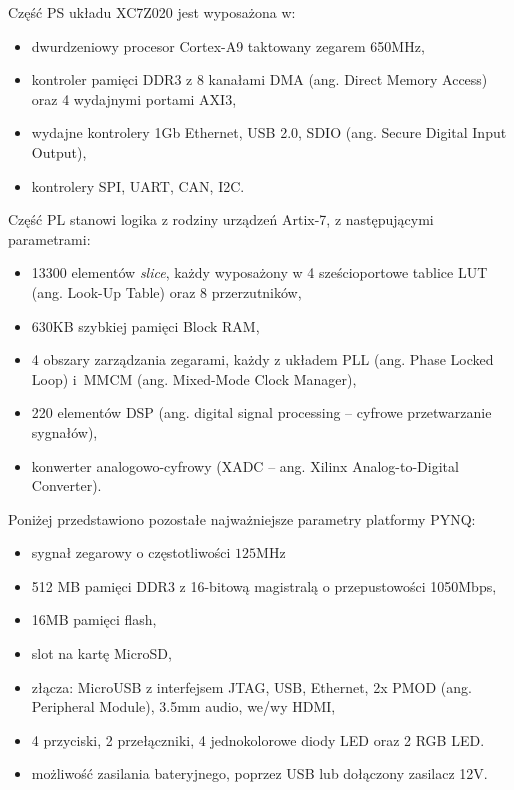 Część PS układu XC7Z020 jest wyposażona w:
\begin{itemize}
	\item dwurdzeniowy procesor Cortex-A9 taktowany zegarem 650MHz,
	\item kontroler pamięci DDR3 z 8 kanałami DMA (ang. Direct Memory Access) oraz 4 wydajnymi portami AXI3, %
	\item wydajne kontrolery 1Gb Ethernet, USB 2.0, SDIO (ang. Secure Digital Input Output),
	\item kontrolery SPI, UART, CAN, I2C.
\end{itemize}
Część PL stanowi logika z rodziny urządzeń Artix-7, z następującymi parametrami:
\begin{itemize}
	\item 13300 elementów \textit{slice}, każdy wyposażony w 4 sześcioportowe tablice LUT (ang. Look-Up Table) oraz 8 przerzutników, %
	\item 630KB szybkiej pamięci Block RAM,
	\item 4 obszary zarządzania zegarami, każdy z układem PLL (ang. Phase Locked Loop) i~MMCM (ang. Mixed-Mode Clock Manager),
	\item 220 elementów DSP (ang. digital signal processing -- cyfrowe przetwarzanie sygnałów),
	\item konwerter analogowo-cyfrowy (XADC -- ang. Xilinx Analog-to-Digital Converter).
\end{itemize}

Poniżej przedstawiono pozostałe najważniejsze parametry platformy PYNQ:
\begin{itemize}
	\item sygnał zegarowy o częstotliwości $125$MHz
	\item 512 MB pamięci DDR3 z 16-bitową magistralą o przepustowości 1050Mbps,
	\item 16MB pamięci flash,
	\item slot na kartę MicroSD,
	\item złącza: MicroUSB z interfejsem JTAG, USB, Ethernet, 2x PMOD (ang. Peripheral Module), 3.5mm audio, we/wy HDMI,
	\item 4 przyciski, 2 przełączniki, 4 jednokolorowe diody LED oraz 2 RGB LED.
	\item możliwość zasilania bateryjnego, poprzez USB lub dołączony zasilacz 12V.
\end{itemize}

